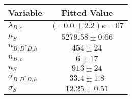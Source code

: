 \begin{tabular}[t]{lc}
\hline
Variable &Fitted Value\\
\hline\hline
$\lambda_{B,c}$&$(-0.0\pm2.2)e-07$\\
\hline
$\mu_S$&$5279.58\pm0.66$\\
\hline
$n_{B, D^* D_s h}$&$454\pm24$\\
\hline
$n_{B,c}$&$6\pm17$\\
\hline
$n_S$&$913\pm24$\\
\hline
$\sigma_{B, D^* D_s h}$&$33.4\pm1.8$\\
\hline
$\sigma_S$&$12.25\pm0.51$\\
\hline
\end{tabular}